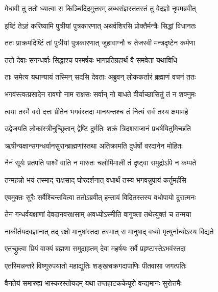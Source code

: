 
\twolineshloka
{मेधावी तु ततो ध्यात्वा स किञ्चिदिदमुत्तरम्}
{लब्धसंज्ञस्ततस्तं तु वेदज्ञो नृपमब्रवीत्} %

\twolineshloka
{इष्टिं तेऽहं करिष्यामि पुत्रीयां पुत्रकारणात्}
{अथर्वशिरसि प्रोक्तैर्मन्त्रैः सिद्धां विधानतः} %

\twolineshloka
{ततः प्राक्रमदिष्टिं तां पुत्रीयां पुत्रकारणात्}
{जुहावाग्नौ च तेजस्वी मन्त्रदृष्टेन कर्मणा} %

\twolineshloka
{ततो देवाः सगन्धर्वाः सिद्धाश्च परमर्षयः}
{भागप्रतिग्रहार्थं वै समवेता यथाविधि} %

\twolineshloka
{ताः समेत्य यथान्यायं तस्मिन् सदसि देवताः}
{अब्रुवन् लोककर्तारं ब्रह्माणं वचनं ततः} %

\twolineshloka
{भगवंस्त्वत्प्रसादेन रावणो नाम राक्षसः}
{सर्वान् नो बाधते वीर्याच्छासितुं तं न शक्नुमः} %

\twolineshloka
{त्वया तस्मै वरो दत्तः प्रीतेन भगवंस्तदा}
{मानयन्तश्च तं नित्यं सर्वं तस्य क्षमामहे} %

\twolineshloka
{उद्वेजयति लोकांस्त्रीनुच्छ्रितान् द्वेष्टि दुर्मतिः}
{शक्रं त्रिदशराजानं प्रधर्षयितुमिच्छति} %

\twolineshloka
{ऋषीन्यक्षान्सगन्धर्वानसुरान्ब्राह्मणांस्तथा}
{अतिक्रामति दुर्धर्षो वरदानेन मोहितः} %

\twolineshloka
{नैनं सूर्यः प्रतपति पार्श्वे वाति न मारुतः}
{चलोर्मिमाली तं दृष्ट्वा समुद्रोऽपि न कम्पते} %

\twolineshloka
{तन्महन्नो भयं तस्माद् राक्षसाद् घोरदर्शनात्}
{वधार्थं तस्य भगवन्नुपायं कर्तुमर्हसि} %

\twolineshloka
{एवमुक्तः सुरैः सर्वैश्चिन्तयित्वा ततोऽब्रवीत्}
{हन्तायं विदितस्तस्य वधोपायो दुरात्मनः} %

\twolineshloka
{तेन गन्धर्वयक्षाणां देवदानवरक्षसाम्}
{अवध्योऽस्मीति वागुक्ता तथेत्युक्तं च तन्मया} %

\twolineshloka
{नाकीर्तयदवज्ञानात् तद् रक्षो मानुषांस्तदा}
{तस्मात् स मानुषाद् वध्यो मृत्युर्नान्योऽस्य विद्यते} %

\twolineshloka
{एतच्छ्रुत्वा प्रियं वाक्यं ब्रह्मणा समुदाहृतम्}
{देवा महर्षयः सर्वे प्रहृष्टास्तेऽभवंस्तदा} %

\twolineshloka
{एतस्मिन्नन्तरे विष्णुरुपयातो महाद्युतिः}
{शङ्खचक्रगदापाणिः पीतवासा जगत्पतिः} %

\twolineshloka
{वैनतेयं समारुह्य भास्करस्तोयदम् यथा}
{तप्तहाटककेयूरो वन्द्यमानः सुरोत्तमैः} %

